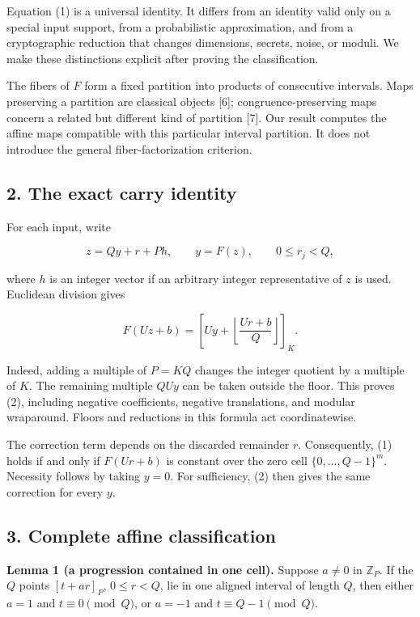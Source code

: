 \documentclass[
]{article}
\begin{document}
Equation (1) is a universal identity. It differs from an identity valid
only on a special input support, from a probabilistic approximation, and
from a cryptographic reduction that changes dimensions, secrets, noise,
or moduli. We make these distinctions explicit after proving the
classification.

The fibers of \(F\) form a fixed partition into products of consecutive
intervals. Maps preserving a partition are classical objects {[}6{]};
congruence-preserving maps concern a related but different kind of
partition {[}7{]}. Our result computes the affine maps compatible with
this particular interval partition. It does not introduce the general
fiber-factorization criterion.

\subsection{2. The exact carry identity}\label{the-exact-carry-identity}

For each input, write

\[
z=Qy+r+Ph,\qquad y=F(z),\qquad 0\le r_j<Q,
\]

where \(h\) is an integer vector if an arbitrary integer representative
of \(z\) is used. Euclidean division gives

\[
F(Uz+b)=\left[Uy+\left\lfloor\frac{Ur+b}{Q}\right\rfloor\right]_K.
\tag{2}
\]

Indeed, adding a multiple of \(P=KQ\) changes the integer quotient by a
multiple of \(K\). The remaining multiple \(QUy\) can be taken outside
the floor. This proves (2), including negative coefficients, negative
translations, and modular wraparound. Floors and reductions in this
formula act coordinatewise.

The correction term depends on the discarded remainder \(r\).
Consequently, (1) holds if and only if \(F(Ur+b)\) is constant over the
zero cell \(\{0,\ldots,Q-1\}^m\). Necessity follows by taking \(y=0\).
For sufficiency, (2) then gives the same correction for every \(y\).

\subsection{3. Complete affine
classification}\label{complete-affine-classification}

\textbf{Lemma 1 (a progression contained in one cell).} Suppose
\(a\ne0\) in \(\mathbb Z_P\). If the \(Q\) points \([t+ar]_P\),
\(0\le r<Q\), lie in one aligned interval of length \(Q\), then either
\(a=1\) and \(t\equiv0\pmod Q\), or \(a=-1\) and \(t\equiv Q-1\pmod Q\).
\end{document}
